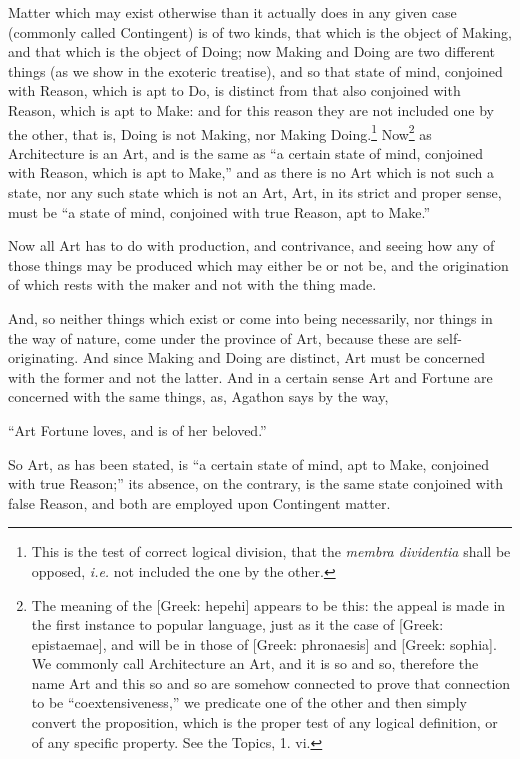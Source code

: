 Matter which may exist otherwise than it actually does in any given case
(commonly called Contingent) is of two kinds, that which is the object of
Making, and that which is the object of Doing; now Making and Doing are two
different things (as we show in the exoteric treatise), and so that state of
mind, conjoined with Reason, which is apt to Do, is distinct from that also
conjoined with Reason, which is apt to Make: and for this reason they are not
included one by the other, that is, Doing is not Making, nor Making Doing.\footnote{This is the test of correct logical division, that the \emph{membra dividentia}
shall be opposed, \emph{i.e.} not included the one by the other.}
Now\footnote{The meaning of the [Greek: hepehi] appears to be this: the appeal is made in
the first instance to popular language, just as it the case of [Greek:
epistaemae], and will be in those of [Greek: phronaesis] and [Greek: sophia].
We commonly call Architecture an Art, and it is so and so, therefore the name
Art and this so and so are somehow connected to prove that connection to be
“coextensiveness,” we predicate one of the other and then simply
convert the proposition, which is the proper test of any logical definition, or
of any specific property. See the Topics, 1. vi.}
as Architecture is an Art, and is the same as “a certain state of mind,
conjoined with Reason, which is apt to Make,” and as there is no Art
which is not such a state, nor any such state which is not an Art, Art, in its
strict and proper sense, must be “a state of mind, conjoined with true
Reason, apt to Make.”

Now all Art has to do with production, and contrivance, and seeing how any of
those things may be produced which may either be or not be, and the origination
of which rests with the maker and not with the thing made.

And, so neither things which exist or come into being necessarily, nor things
in the way of nature, come under the province of Art, because these are
self-originating. And since Making and Doing are distinct, Art must be
concerned with the former and not the latter. And in a certain sense Art and
Fortune are concerned with the same things, as, Agathon says by the way,

“Art Fortune loves, and is of her beloved.”

So Art, as has been stated, is “a certain state of mind, apt to Make,
conjoined with true Reason;” its absence, on the contrary, is the same
state conjoined with false Reason, and both are employed upon Contingent
matter.

